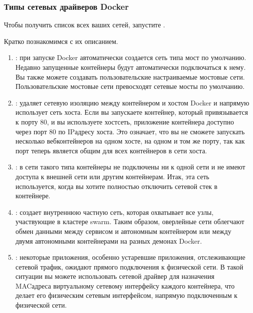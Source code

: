 \documentclass[letterpaper,10pt,russian]{sphinxmanual}
\begin{document}
\sphinxAtStartPar
{}


\subsubsection{Типы сетевых драйверов Docker}
\label{\detokenize{educational_materials/docker_network/content:id5}}
\sphinxAtStartPar
Чтобы получить список всех ваших сетей, запустите .

\sphinxAtStartPar
{}

\sphinxAtStartPar
Кратко познакомимся с их описанием.
\begin{enumerate}
%
\item {} 
\sphinxAtStartPar
{}: при запуске Docker автоматически создается сеть типа мост по умолчанию. Недавно запущенные контейнеры будут автоматически подключаться к нему. Вы также можете создавать пользовательские настраиваемые мостовые сети. Пользовательские мостовые сети превосходят сетевые мосты по умолчанию.

\item {} 
\sphinxAtStartPar
{}: удаляет сетевую изоляцию между контейнером и хостом Docker и напрямую использует сеть хоста. Если вы запускаете контейнер, который привязывается к порту 80, и вы используете хост\sphinxhyphen{}сеть, приложение контейнера доступно через порт 80 по IP\sphinxhyphen{}адресу хоста. Это означает, что вы не сможете запускать несколько веб\sphinxhyphen{}контейнеров на одном хосте, на одном и том же порту, так как порт теперь является общим для всех контейнеров в сети хоста.

\item {} 
\sphinxAtStartPar
{}: в сети такого типа контейнеры не подключены ни к одной сети и не имеют доступа к внешней сети или другим контейнерам. Итак, эта сеть используется, когда вы хотите полностью отключить сетевой стек в контейнере.

\item {} 
\sphinxAtStartPar
{}: создает внутреннюю частную сеть, которая охватывает все узлы, участвующие в кластере swarm. Таким образом, оверлейные сети облегчают обмен данными между сервисом  и автономным контейнером или между двумя автономными контейнерами на разных демонах Docker.

\item {} 
\sphinxAtStartPar
{}: некоторые приложения, особенно устаревшие приложения, отслеживающие сетевой трафик, ожидают прямого подключения к физической сети. В такой ситуации вы можете использовать сетевой драйвер  для назначения MAC\sphinxhyphen{}адреса виртуальному сетевому интерфейсу каждого контейнера, что делает его физическим сетевым интерфейсом, напрямую подключенным к физической сети.

\end{enumerate}
\end{document}
